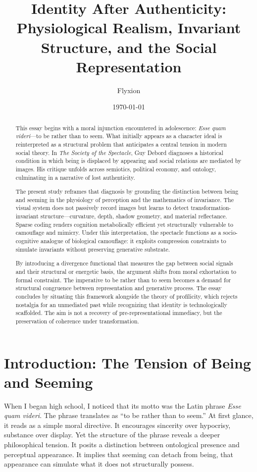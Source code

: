 \documentclass[11pt]{article}
\title{Identity After Authenticity:\\
Physiological Realism, Invariant Structure, and the Social Representation}
\author{Flyxion}
\date{\today}
\begin{document}
\maketitle
\begin{abstract}

This essay begins with a moral injunction encountered in adolescence: \textit{Esse quam videri}—to be rather than to seem. What initially appears as a character ideal is reinterpreted as a structural problem that anticipates a central tension in modern social theory. In \textit{The Society of the Spectacle}, Guy Debord diagnoses a historical condition in which being is displaced by appearing and social relations are mediated by images. His critique unfolds across semiotics, political economy, and ontology, culminating in a narrative of lost authenticity.

The present study reframes that diagnosis by grounding the distinction between being and seeming in the physiology of perception and the mathematics of invariance. The visual system does not passively record images but learns to detect transformation-invariant structure—curvature, depth, shadow geometry, and material reflectance. Sparse coding renders cognition metabolically efficient yet structurally vulnerable to camouflage and mimicry. Under this interpretation, the spectacle functions as a socio-cognitive analogue of biological camouflage: it exploits compression constraints to simulate invariants without preserving generative substrate.

By introducing a divergence functional that measures the gap between social signals and their structural or energetic basis, the argument shifts from moral exhortation to formal constraint. The imperative to be rather than to seem becomes a demand for structural congruence between representation and generative process. The essay concludes by situating this framework alongside the theory of profilicity, which rejects nostalgia for an unmediated past while recognizing that identity is technologically scaffolded. The aim is not a recovery of pre-representational immediacy, but the preservation of coherence under transformation.

\end{abstract}

\newpage
\section{Introduction: The Tension of Being and Seeming}

When I began high school, I noticed that its motto was the Latin phrase \textit{Esse quam videri}. The phrase translates as ``to be rather than to seem.'' At first glance, it reads as a simple moral directive. It encourages sincerity over hypocrisy, substance over display. Yet the structure of the phrase reveals a deeper philosophical tension. It posits a distinction between ontological presence and perceptual appearance. It implies that seeming can detach from being, that appearance can simulate what it does not structurally possess.
\end{document}
